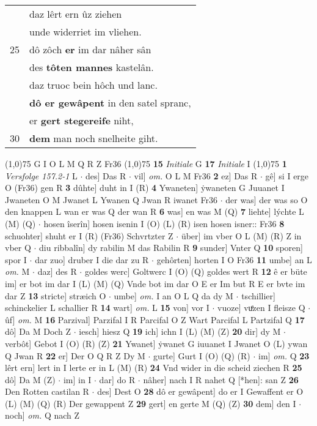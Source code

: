 \documentclass[8pt,a4paper,notitlepage]{article}
\begin{document}
\begin{table}[ht]
\begin{minipage}[t]{0.5\linewidth}
\begin{tabular}{rl}
 & daz lêrt ern ûz ziehen\\ 
 & unde widerriet im vliehen.\\ 
25 & dô zôch \textbf{er} im dar nâher sân\\ 
 & des \textbf{tôten mannes} kastelân.\\ 
 & daz truoc bein hôch und lanc.\\ 
 & \textbf{dô er gewâpent} in den satel spranc,\\ 
 & er \textbf{gert stegereife} niht,\\ 
30 & \textbf{dem} man noch snelheite giht.\\ 
\end{tabular}
\scriptsize
\line(1,0){75} \newline
G I O L M Q R Z Fr36 \newline
\line(1,0){75} \newline
\textbf{15} \textit{Initiale} G  \textbf{17} \textit{Initiale} I  \newline
\line(1,0){75} \newline
\textbf{1} \textit{Versfolge 157.2-1} L   $\cdot$ des] Das R  $\cdot$ vil] \textit{om.} O L M Fr36 \textbf{2} ez] Das R  $\cdot$ gê] si I erge O (Fr36) gen R \textbf{3} dûhte] duht in I (R) \textbf{4} Ywaneten] ẏwaneten G Juuanet I Jwaneten O M Jwanet L Ywanen Q Jwan R iwanet Fr36  $\cdot$ der was] der was so O den knappen L wan er was Q der wan R \textbf{6} was] en was M (Q) \textbf{7} liehte] lýchte L (M) (Q)  $\cdot$ hosen îserîn] hosen isenin I (O) (L) (R) isen hosen isner:: Fr36 \textbf{8} schuohter] shuht er I (R) (Fr36) Schvrtzter Z  $\cdot$ über] im vber O L (M) (R) Z in vber Q  $\cdot$ diu ribbalîn] dy rabilin M das Rabilin R \textbf{9} sunder] Vnter Q \textbf{10} sporen] spor I  $\cdot$ dar zuo] druber I die dar zu R  $\cdot$ gehôrten] horten I O Fr36 \textbf{11} umbe] an L \textit{om.} M  $\cdot$ daz] des R  $\cdot$ goldes werc] Goltwerc I (O) (Q) goldes wert R \textbf{12} ê er büte im] er bot im dar I (L) (M) (Q) Vnde bot im dar O E er Im but R E er bvte im dar Z \textbf{13} stricte] stræich O  $\cdot$ umbe] \textit{om.} I an O L Q da dy M  $\cdot$ tschillier] schinckelier L schallier R \textbf{14} wart] \textit{om.} L \textbf{15} von] vor I  $\cdot$ vuoze] vuͤzen I fleisze Q  $\cdot$ ûf] \textit{om.} M \textbf{16} Parzival] Parzifal I R Parcifal O Z Wart Parcifal L Partzifal Q \textbf{17} dô] Da M Doch Z  $\cdot$ iesch] hiesz Q \textbf{19} ich] ichn I (L) (M) (Z) \textbf{20} dir] dy M  $\cdot$ verbôt] Gebot I (O) (R) (Z) \textbf{21} Ywanet] ẏwanet G iuuanet I Jwanet O (L) ywan Q Jwan R \textbf{22} er] Der O Q R Z Dy M  $\cdot$ gurte] Gurt I (O) (Q) (R)  $\cdot$ im] \textit{om.} Q \textbf{23} lêrt ern] lert in I lerte er in L (M) (R) \textbf{24} Vnd wider in die scheid ziechen R \textbf{25} dô] Da M (Z)  $\cdot$ im] in I  $\cdot$ dar] do R  $\cdot$ nâher] nach I R nahet Q [*hen]: san Z \textbf{26} Den Rotten castilan R  $\cdot$ des] Dest O \textbf{28} dô er gewâpent] do er I Gewaffent er O (L) (M) (Q) (R) Der gewappent Z \textbf{29} gert] en gerte M (Q) (Z) \textbf{30} dem] den I  $\cdot$ noch] \textit{om.} Q nach Z \newline

\end{minipage}
\end{table}
\end{document}
